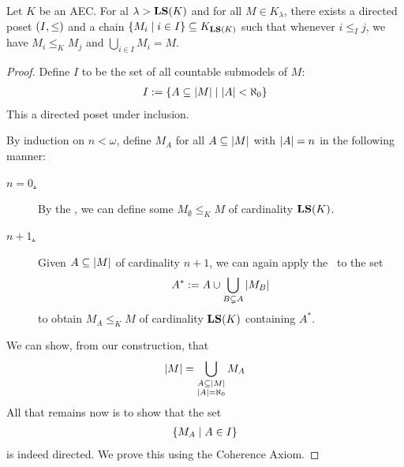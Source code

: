 \begin{boxtheorem}
    Let $K$ be an AEC. For al $\lambda > \mathbf{LS}(K)$ and for all $M \in K_\lambda$, there exists a directed poset $\left( I, \leq \right)$ and a chain $\left\{ M_i \; \middle\vert \; i \in I \right\} \subseteq K_{\mathbf{LS}(K)}$ such that whenever $i \leq_I j$, we have $M_i \leq_K M_j$ and $\bigcup_{i \in I} M_i = M$.
\end{boxtheorem}
\begin{proof}
    Define $I$ to be the set of all countable submodels of $M$:
    \begin{align*}
        I := \left\{ A \subseteq \left\lvert M \right\rvert \; \middle\vert \; \left\lvert A \right\rvert < \aleph_0 \right\}
    \end{align*}
    This a directed poset under inclusion.

    By induction on $n < \omega$, define $M_A$ for all $A \subseteq \left\lvert M \right\rvert$ with $\left\lvert A \right\rvert = n$ in the following manner:
    \begin{description}
        \item[\underline{$n = 0$.}]  By the \LSA, we can define some $M_{\emptyset} \leq_K M$ of cardinality $\mathbf{LS}(K)$.

        \item[\underline{$n + 1$.}] Given $A \subseteq \left\lvert M \right\rvert$ of cardinality $n + 1$, we can again apply the \LSA\ to the set
        \begin{align*}
            A^* := A \cup \bigcup_{B \subsetneq A} \left\lvert M_B \right\rvert
        \end{align*}
        to obtain $M_A \leq_K M$ of cardinality $\mathbf{LS}(K)$ containing $A^*$.
    \end{description}
    We can show, from our construction, that
    \begin{align*}
        \left\lvert M \right\rvert = \bigcup_{\substack{A \subseteq \left\lvert M \right\rvert \\ \left\lvert A \right\rvert = \aleph_0}} M_A
    \end{align*}
    All that remains now is to show that the set
    \begin{align*}
        \left\{ M_A \; \middle\vert \; A \in I \right\}
    \end{align*}
    is indeed directed. We prove this using the Coherence Axiom.


\end{proof}
